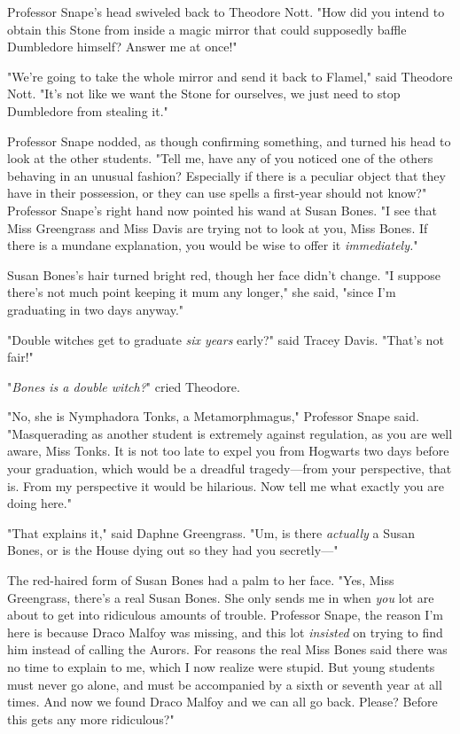 Professor Snape's head swiveled back to Theodore Nott. "How did you intend to
obtain this Stone from inside a magic mirror that could supposedly baffle
Dumbledore himself? Answer me at once!"

"We're going to take the whole mirror and send it back to Flamel," said
Theodore Nott. "It's not like we want the Stone for ourselves, we just need to
stop Dumbledore from stealing it."

Professor Snape nodded, as though confirming something, and turned his head to
look at the other students. "Tell me, have any of you noticed one of the others
behaving in an unusual fashion? Especially if there is a peculiar object that
they have in their possession, or they can use spells a first-year should not
know?" Professor Snape's right hand now pointed his wand at Susan Bones. "I see
that Miss Greengrass and Miss Davis are trying not to look at you, Miss Bones.
If there is a mundane explanation, you would be wise to offer it
\emph{immediately.}"

Susan Bones's hair turned bright red, though her face didn't change. "I suppose
there's not much point keeping it mum any longer," she said, "since I'm
graduating in two days anyway."

"Double witches get to graduate \emph{six years} early?" said Tracey Davis.
"That's not fair!"

"\emph{Bones is a double witch?}" cried Theodore.

"No, she is Nymphadora Tonks, a Metamorphmagus," Professor Snape said.
"Masquerading as another student is extremely against regulation, as you are
well aware, Miss Tonks. It is not too late to expel you from Hogwarts two days
before your graduation, which would be a dreadful tragedy—from your
perspective, that is. From my perspective it would be hilarious. Now tell me
what exactly you are doing here."

"That explains it," said Daphne Greengrass. "Um, is there \emph{actually} a
Susan Bones, or is the House dying out so they had you secretly—"

The red-haired form of Susan Bones had a palm to her face. "Yes, Miss
Greengrass, there's a real Susan Bones. She only sends me in when \emph{you}
lot are about to get into ridiculous amounts of trouble. Professor Snape, the
reason I'm here is because Draco Malfoy was missing, and this lot
\emph{insisted} on trying to find him instead of calling the Aurors. For
reasons the real Miss Bones said there was no time to explain to me, which I
now realize were stupid. But young students must never go alone, and must be
accompanied by a sixth or seventh year at all times. And now we found Draco
Malfoy and we can all go back. Please? Before this gets any more ridiculous?"


